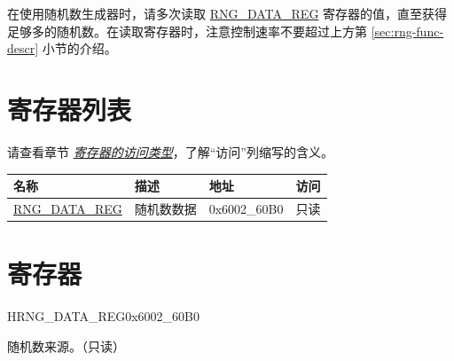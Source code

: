 \documentclass[main\_\_CN.tex]{subfiles}
\begin{document}
在使用随机数生成器时，请多次读取 \hyperref[regdesc:RNGDATAREG]{RNG\_DATA\_REG} 寄存器的值，直至获得足够多的随机数。在读取寄存器时，注意控制速率不要超过上方第 \ref{sec:rng-func-descr} 小节的介绍。 


\hypertarget{rng-reg-summ}{}
\section{寄存器列表}

请查看章节 \hyperref[glossary-access-types]{\textit{寄存器的访问类型}}，了解“访问”列缩写的含义。

\begin{table}[H]
    \centering
    \begin{tabular}{ | l | l | l | l |  }
    \hline
    \rowcolor{lightgray}
    \textbf{名称} & \textbf{描述} & \textbf{地址} & \textbf{访问} \\ 
    \hline
    \hyperref[regdesc:RNGDATAREG]{RNG\_DATA\_REG} & 随机数数据 & 0x6002\_60B0 & 只读 \\ 
    \hline
    \end{tabular}
\end{table}




\section{寄存器}

\begin{register}{H}{RNG\_DATA\_REG}{0x6002\_60B0}\label{regdesc:RNGDATAREG}
%
\regnewline%
\begin{regdesc}\begin{reglist}
\item [RNG\_DATA]随机数来源。（只读）
\end{reglist}\end{regdesc}
\end{register}
\end{document}
